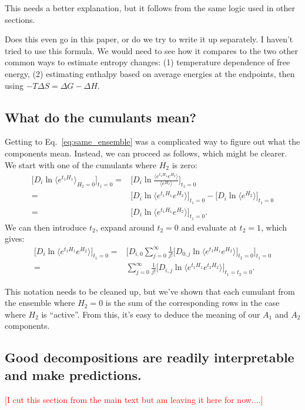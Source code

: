 \documentclass{article}
\newcommand{\warning}[1]{{\textsf{{\textcolor{red}{{[#1]}{}}}}}}
\begin{document}
This needs a better explanation, but it follows from the same logic used in other sections.

Does this even go in this paper, or do we try to write it up separately. I haven't tried to use this formula. We would need to see how it compares to the two other common ways to estimate entropy changes: (1) temperature dependence of free energy, (2) estimating enthalpy based on average energies at the endpoints, then using $-T \Delta S = \Delta G - \Delta H$.

\subsection*{What do the cumulants mean?}

Getting to Eq.~\ref{eq:same_ensemble} was a complicated way to figure out what the components mean. Instead, we can proceed as follows, which might be clearer. We start with one of the cumulants where $H_2$ is zero:
\begin{align}
\Bigg[ D_i \ln \langle e^{t_1 H_1} \rangle_{H_2=0} \Bigg]_{t_1=0} =&
	\Bigg[ D_i \ln \frac{\langle e^{t_1 H_1} e^{H_2} \rangle}{\langle e^{H_2} \rangle} \Bigg]_{t_1=0} \\
	= &
		\Bigg[ D_i \ln \langle e^{t_1 H_1} e^{H_2} \rangle \Bigg]_{t_1=0}  -
		\Bigg[ D_i \ln {\langle e^{H_2} \rangle} \Bigg]_{t_1=0} \\
	= &
		\Bigg[ D_i \ln \langle e^{t_1 H_1} e^{H_2} \rangle \Bigg]_{t_1=0}.
\end{align}
We can then introduce $t_2$, expand around $t_2=0$ and evaluate at $t_2=1$, which gives:
\begin{align}
\Bigg[ D_i \ln \langle e^{t_1 H_1} e^{H_2} \rangle \Bigg]_{t_1=0} =&
	\Bigg[ D_{i,0} \sum_{j=0}^\infty \frac{1}{j!} \Bigg[
		D_{0,j} \ln \langle e^{t_1 H_1} e^{H_2} \rangle
	\Bigg]_{t_2=0}
\Bigg]_{t_1=0} \\
=&
\sum_{j=0}^\infty \frac{1}{j!}
\Bigg[
	D_{i,j} \ln \langle e^{t_1 H_1} e^{t_2 H_2} \rangle
\Bigg]_{t_1=t_2=0}.
\end{align}

This notation needs to be cleaned up, but we've shown that each cumulant from the ensemble where $H_2=0$ is the sum of the corresponding rows in the case where $H_2$ is ``active''. From this, it's easy to deduce the meaning of our $A_1$ and $A_2$ components.




\subsection*{Good decompositions are readily interpretable and make predictions.}
\warning{I cut this section from the main text but am leaving it here for now....}
\end{document}
